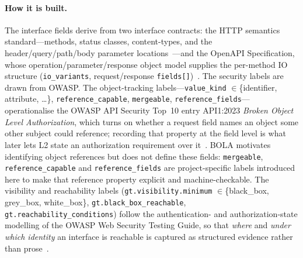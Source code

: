 \documentclass[11pt,a4paper]{article}
\newcommand{\cd}[1]{\lstinline[basicstyle=\ttfamily\small]|#1|}
\begin{document}
\paragraph{How it is built.} The interface fields derive from two interface contracts:
the HTTP semantics standard---methods, status classes, content-types, and the
header/query/path/body parameter locations~\citep{httpsem}---and the OpenAPI
Specification, whose operation/parameter/response object model supplies the per-method IO
structure (\cd{io_variants}, request/response \cd{fields[]})~\citep{openapi}. The security
labels are drawn from OWASP. The object-tracking labels---\cd{value_kind}
$\in$\{identifier, attribute, \dots\}, \cd{reference_capable}, \cd{mergeable},
\cd{reference_fields}---operationalise the OWASP API Security Top~10 entry API1:2023
\emph{Broken Object Level Authorization}, which turns on whether a request field names an
object some other subject could reference; recording that property at the field level is
what later lets L2 state an authorization requirement over it~\citep{owaspapi}. BOLA
motivates identifying object references but does not define these fields: \cd{mergeable},
\cd{reference_capable} and \cd{reference_fields} are project-specific labels introduced here
to make that reference property explicit and machine-checkable. The
visibility and reachability labels (\cd{gt.visibility.minimum} $\in$\{black\_box,
grey\_box, white\_box\}, \cd{gt.black_box_reachable}, \cd{gt.reachability_conditions})
follow the authentication- and authorization-state modelling of the OWASP Web Security
Testing Guide, so that \emph{where} and \emph{under which identity} an interface is
reachable is captured as structured evidence rather than prose~\citep{wstg}.
\end{document}
